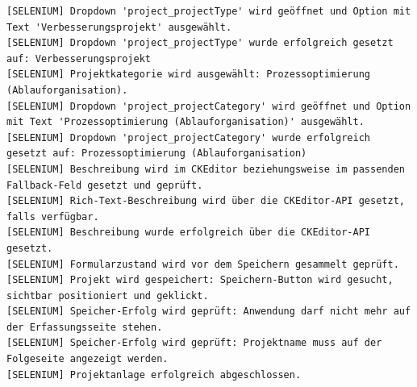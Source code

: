 \begin{lstlisting}[caption={Selenium -- Neues Projekt (Erfolgreich)}, label={lst:sel_new_proj_ok}, style=logStyle]
[SELENIUM] Dropdown 'project_projectType' wird geöffnet und Option mit Text 'Verbesserungsprojekt' ausgewählt.
[SELENIUM] Dropdown 'project_projectType' wurde erfolgreich gesetzt auf: Verbesserungsprojekt
[SELENIUM] Projektkategorie wird ausgewählt: Prozessoptimierung (Ablauforganisation).
[SELENIUM] Dropdown 'project_projectCategory' wird geöffnet und Option mit Text 'Prozessoptimierung (Ablauforganisation)' ausgewählt.
[SELENIUM] Dropdown 'project_projectCategory' wurde erfolgreich gesetzt auf: Prozessoptimierung (Ablauforganisation)
[SELENIUM] Beschreibung wird im CKEditor beziehungsweise im passenden Fallback-Feld gesetzt und geprüft.
[SELENIUM] Rich-Text-Beschreibung wird über die CKEditor-API gesetzt, falls verfügbar.
[SELENIUM] Beschreibung wurde erfolgreich über die CKEditor-API gesetzt.
[SELENIUM] Formularzustand wird vor dem Speichern gesammelt geprüft.
[SELENIUM] Projekt wird gespeichert: Speichern-Button wird gesucht, sichtbar positioniert und geklickt.
[SELENIUM] Speicher-Erfolg wird geprüft: Anwendung darf nicht mehr auf der Erfassungsseite stehen.
[SELENIUM] Speicher-Erfolg wird geprüft: Projektname muss auf der Folgeseite angezeigt werden.
[SELENIUM] Projektanlage erfolgreich abgeschlossen.
\end{lstlisting}

